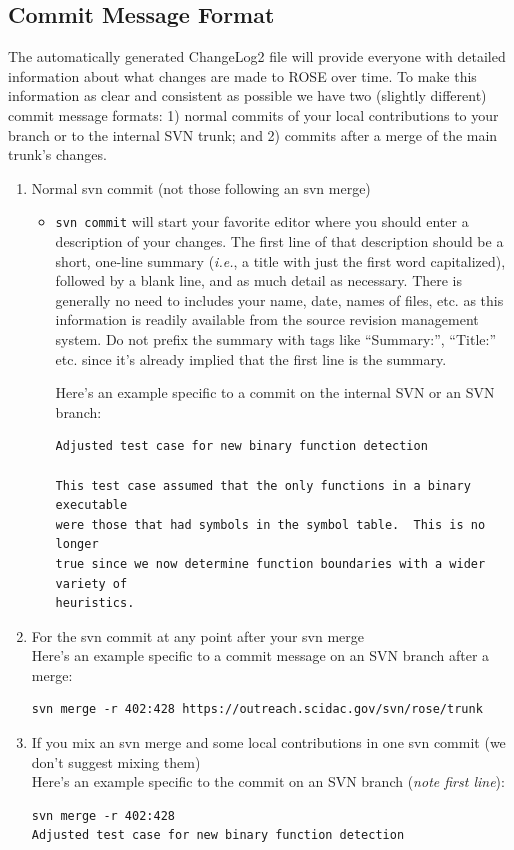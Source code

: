 \subsection{Commit Message Format}
\label{CommitMessageFormat}
   The automatically generated ChangeLog2 file will provide everyone with
detailed information about what changes are made to ROSE over time. To
make this information as clear and consistent as possible we have two
(slightly different) commit message formats:
1) normal commits of your local contributions to your branch or to 
   the internal SVN trunk; and
2) commits after a merge of the main trunk's changes.
\begin{enumerate}
   \item Normal svn commit (not those following an svn merge)
   \begin{itemize}
      \item {\tt svn commit} will start your favorite editor where you should enter a
	    description of your changes. The first line of that description should be
            a short, one-line summary ({\it i.e.}, a title with just the first word capitalized),
            followed by a blank line, and as much detail as necessary. There is generally
            no need to includes your name, date, names of files, etc. as this information
            is readily available from the source revision management system. Do not prefix
            the summary with tags like ``Summary:'', ``Title:'' etc. since it's already
            implied that the first line is the summary.

	    Here's an example specific to a commit on the internal SVN or an SVN branch:
	    {\indent
	       \begin{verbatim}
Adjusted test case for new binary function detection
    
This test case assumed that the only functions in a binary executable
were those that had symbols in the symbol table.  This is no longer
true since we now determine function boundaries with a wider variety of
heuristics.
	       \end{verbatim} 
            }
   \end{itemize}
   \item For the svn commit at any point after your svn merge \\
	    Here's an example specific to a commit message on an SVN branch after a merge:
	    {\indent
	       \begin{verbatim}
svn merge -r 402:428 https://outreach.scidac.gov/svn/rose/trunk
	       \end{verbatim} 
            }
   \item If you mix an svn merge and some local contributions in one svn
   commit (we don't suggest mixing them)\\
	    Here's an example specific to the commit on an SVN branch ({\em note first line}):
	    {\indent
	       \begin{verbatim}
svn merge -r 402:428
Adjusted test case for new binary function detection
    

\end{verbatim}}
\end{enumerate}
